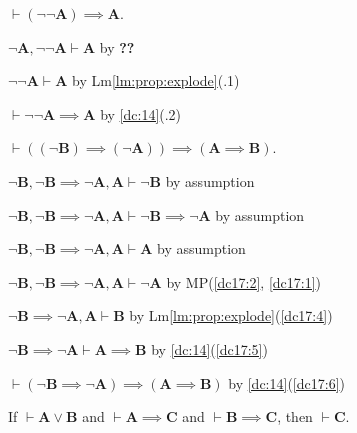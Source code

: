 \documentclass{amsart}%
\newcommand\metavariable[1]{\boldsymbol{#1}}
\begin{document}
\begin{dc}\label{dc:16}
$\vdash(\neg\neg\metavariable{A})\implies\metavariable{A}$.
\end{dc}

\begin{pf}
\item $\neg\metavariable{A},\neg\neg\metavariable{A}\vdash\metavariable{A}$
  by \textbf{??}
\item $\neg\neg\metavariable{A}\vdash\metavariable{A}$ by Lm\ref{lm:prop:explode}(.1)
\item $\vdash\neg\neg\metavariable{A}\implies\metavariable{A}$ by \ref{dc:14}(.2)
\end{pf}

\begin{dc}\label{dc:17}
$\vdash((\neg\metavariable{B})\implies(\neg\metavariable{A}))\implies(\metavariable{A}\implies\metavariable{B})$.
\end{dc}

\begin{pf}
\item\label{dc17:1} $\neg\metavariable{B},\neg\metavariable{B}\implies\neg\metavariable{A},\metavariable{A}\vdash\neg\metavariable{B}$
by assumption
\item\label{dc17:2} $\neg\metavariable{B},\neg\metavariable{B}\implies\neg\metavariable{A},\metavariable{A}\vdash\neg\metavariable{B}\implies\neg\metavariable{A}$
by assumption
\item\label{dc17:3} $\neg\metavariable{B},\neg\metavariable{B}\implies\neg\metavariable{A},\metavariable{A}\vdash\metavariable{A}$
by assumption
\item\label{dc17:4} $\neg\metavariable{B},\neg\metavariable{B}\implies\neg\metavariable{A},\metavariable{A}\vdash\neg\metavariable{A}$ by MP(\ref{dc17:2}, \ref{dc17:1})
\item\label{dc17:5} $\neg\metavariable{B}\implies\neg\metavariable{A},\metavariable{A}\vdash\metavariable{B}$ by Lm\ref{lm:prop:explode}(\ref{dc17:4})
\item\label{dc17:6} $\neg\metavariable{B}\implies\neg\metavariable{A}\vdash\metavariable{A}\implies\metavariable{B}$ by \ref{dc:14}(\ref{dc17:5})
\item\label{dc17:7} $\vdash(\neg\metavariable{B}\implies\neg\metavariable{A})\implies(\metavariable{A}\implies\metavariable{B})$ by \ref{dc:14}(\ref{dc17:6})
\end{pf}

\begin{dc}\label{dc:18}
If $\vdash\metavariable{A}\lor\metavariable{B}$
and $\vdash\metavariable{A}\implies\metavariable{C}$
and $\vdash\metavariable{B}\implies\metavariable{C}$,
then $\vdash\metavariable{C}$.
\end{dc}
\end{document}
